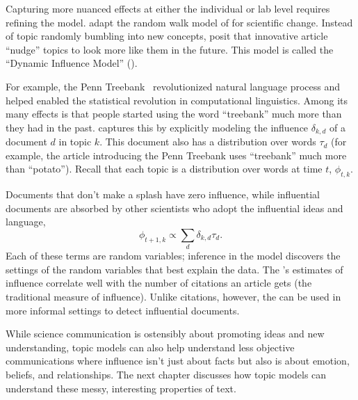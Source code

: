 Capturing more nuanced effects at either the individual or lab level requires
refining the model.  \citet{gerrish-10} adapt the random walk model of
\citet{wang-08} for scientific change.  Instead of topic randomly bumbling into
new concepts, \citet{gerrish-10} posit that innovative article ``nudge'' topics
to look more like them in the future.  This model is called the ``Dynamic
Influence Model'' ().

For example, the Penn Treebank~\citep{marcus-93} revolutionized natural language
process and helped enabled the statistical revolution in computational
linguistics.  Among its many effects is that people started using the word
``treebank'' much more than they had in the past.   captures this by
explicitly modeling the influence $\delta_{k,d}$ of a document $d$ in topic
$k$.  This document also has a distribution over words $\tau_d$ (for example, the article
introducing the Penn Treebank uses ``treebank'' much more than ``potato'').
Recall that each topic is a distribution over words at time $t$, $\phi_{t,k}$.

Documents that don't make a splash have zero influence, while influential
documents are absorbed by other scientists who adopt the influential ideas and
language,
\begin{equation}
  \phi_{t+1,k} \propto \sum_d \delta_{k,d} \tau_d.
\end{equation}
Each of these terms are random variables; inference in the model discovers the
settings of the random variables that best explain the data.  The 's
estimates of influence correlate well with the number of citations an article
gets (the traditional measure of influence).  Unlike citations, however, the
 can be used in more informal settings to detect influential documents.

While science communication is ostensibly about promoting ideas and new
understanding, topic models can also help understand less objective
communications where influence isn't just about facts but also is about emotion,
beliefs, and relationships.  The next chapter discusses how topic models can
understand these messy, interesting properties of text.
